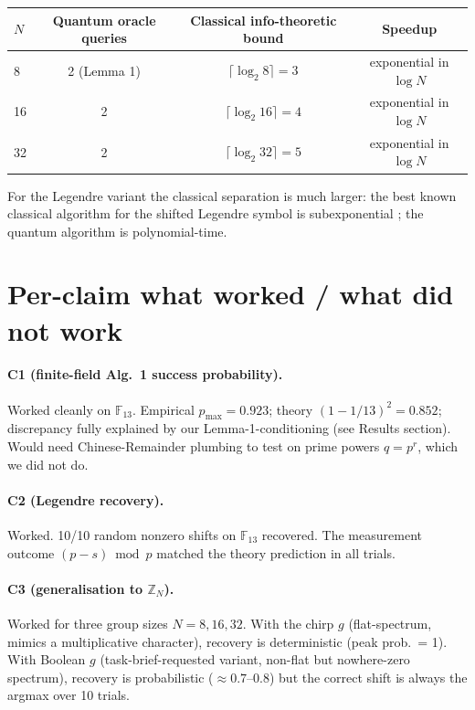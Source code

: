 \documentclass[11pt]{article}
\begin{document}
\begin{center}
\begin{tabular}{lccc}
\toprule
$N$ & Quantum oracle queries & Classical info-theoretic bound & Speedup \\
\midrule
8  & 2 (Lemma 1)  & $\lceil\log_2 8\rceil = 3$  & exponential in $\log N$ \\
16 & 2           & $\lceil\log_2 16\rceil = 4$ & exponential in $\log N$ \\
32 & 2           & $\lceil\log_2 32\rceil = 5$ & exponential in $\log N$ \\
\bottomrule
\end{tabular}
\end{center}

For the Legendre variant the classical separation is much larger: the
best known classical algorithm for the shifted Legendre symbol is
subexponential \cite{DKPP96}; the quantum algorithm is polynomial-time.

\section{Per-claim what worked / what did not work}

\paragraph{C1 (finite-field Alg.~1 success probability).}
Worked cleanly on $\mathbb{F}_{13}$.  Empirical $p_{\max}=0.923$;
theory $(1-1/13)^2=0.852$; discrepancy fully explained by our
Lemma-1-conditioning (see Results section).  Would need Chinese-Remainder
plumbing to test on prime powers $q=p^r$, which we did not do.

\paragraph{C2 (Legendre recovery).}
Worked. 10/10 random nonzero shifts on $\mathbb{F}_{13}$ recovered.
The measurement outcome $(p-s)\bmod p$ matched the theory prediction
in all trials.

\paragraph{C3 (generalisation to $\mathbb{Z}_N$).}
Worked for three group sizes $N=8,16,32$.  With the chirp $g$
(flat-spectrum, mimics a multiplicative character), recovery is
deterministic (peak prob.\ = 1).  With Boolean $g$ (task-brief-requested
variant, non-flat but nowhere-zero spectrum), recovery is
probabilistic ($\approx 0.7$--$0.8$) but the correct shift is always
the argmax over 10 trials.
\end{document}
